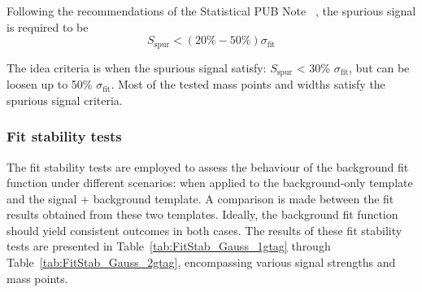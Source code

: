 %

Following the recommendations of the Statistical PUB Note~\cite{ATL-PHYS-PUB-2020-028}
, the spurious signal is required to be
\begin{equation}
 S_\mathrm{spur} < (20\% - 50\%)\sigma_\mathrm{fit}
\end{equation}

The idea criteria is when the spurious signal satisfy: $S_\mathrm{spur}$ < 30\% $\sigma_\mathrm{fit}$, but can be loosen up to 50\% $\sigma_\mathrm{fit}$. Most of the tested mass points and widths satisfy the spurious signal criteria. 

\FloatBarrier

\subsubsection{Fit stability tests}
The fit stability tests are employed to assess the behaviour of the background fit function under different scenarios: when applied to the background-only template and the signal + background template. A comparison is made between the fit results obtained from these two templates. Ideally, the background fit function should yield consistent outcomes in both cases. The results of these fit stability tests are presented in Table~\ref{tab:FitStab_Gauss_1gtag} through Table~\ref{tab:FitStab_Gauss_2gtag}, encompassing various signal strengths and mass points.

